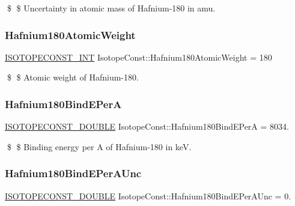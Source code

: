 \$ \$ Uncertainty in atomic mass of Hafnium-\/180 in amu. \mbox{\label{group___isotope_const-_hafnium-_hf180_ga313a0a02863aef8d794c3353d73aca1a}} 
\subsubsection{\texorpdfstring{Hafnium180\+Atomic\+Weight}{Hafnium180AtomicWeight}}
{\footnotesize\ttfamily \mbox{\hyperlink{group___isotope_const-_macros_ga5f18360b3e99483a35c32d789e62621c}{I\+S\+O\+T\+O\+P\+E\+C\+O\+N\+S\+T\+\_\+\+I\+NT}} Isotope\+Const\+::\+Hafnium180\+Atomic\+Weight = 180}

\$ \$ Atomic weight of Hafnium-\/180. \mbox{\label{group___isotope_const-_hafnium-_hf180_ga7e222c9f539568c92e9b43df2de801fd}} 
\subsubsection{\texorpdfstring{Hafnium180\+Bind\+E\+PerA}{Hafnium180BindEPerA}}
{\footnotesize\ttfamily \mbox{\hyperlink{group___isotope_const-_macros_ga8f45a7272ce02c0b4c65c44636ed719a}{I\+S\+O\+T\+O\+P\+E\+C\+O\+N\+S\+T\+\_\+\+D\+O\+U\+B\+LE}} Isotope\+Const\+::\+Hafnium180\+Bind\+E\+PerA = 8034.}

\$ \$ Binding energy per A of Hafnium-\/180 in keV. \mbox{\label{group___isotope_const-_hafnium-_hf180_ga04312d7d4b01957c09fa2b333c626b57}} 
\subsubsection{\texorpdfstring{Hafnium180\+Bind\+E\+Per\+A\+Unc}{Hafnium180BindEPerAUnc}}
{\footnotesize\ttfamily \mbox{\hyperlink{group___isotope_const-_macros_ga8f45a7272ce02c0b4c65c44636ed719a}{I\+S\+O\+T\+O\+P\+E\+C\+O\+N\+S\+T\+\_\+\+D\+O\+U\+B\+LE}} Isotope\+Const\+::\+Hafnium180\+Bind\+E\+Per\+A\+Unc = 0.}


